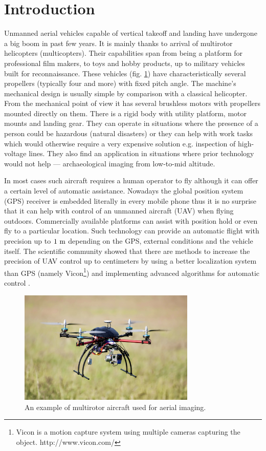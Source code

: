 \section{Introduction}

Unmanned aerial vehicles capable of vertical takeoff and landing have undergone a big boom in past few years. It is mainly thanks to arrival of multirotor helicopters (multicopters). Their capabilities span from being a platform for professional film makers, to toys and hobby products, up to military vehicles built for reconnaissance. These vehicles (fig. \ref{fig:quadru1}) have characteristically several propellers (typically four and more) with fixed pitch angle. The machine's mechanical design is usually simple by comparison with a classical helicopter. From the mechanical point of view it has several brushless motors with propellers mounted directly on them. There is a rigid body with utility platform, motor mounts and landing gear. They can operate in situations where the presence of a person could be hazardous (natural disasters) or they can help with work tasks which would otherwise require a very expensive solution e.g. inspection of high-voltage lines. They also find an application in situations where prior technology would not help --- archaeological imaging from low-to-mid altitude.

In most cases such aircraft requires a human operator to fly although it can offer a certain level of automatic assistance. Nowadays the global position system (GPS) receiver is embedded literally in every mobile phone thus it is no surprise that it can help with control of an unmanned aircraft (UAV) when flying outdoors. Commercially available platforms can assist with position hold or even fly to a particular location. Such technology can provide an automatic flight with precision up to $1 ~\mathrm{m}$ depending on the GPS, external conditions and the vehicle itself. The scientific community showed that there are methods to increase the precision of UAV control up to centimeters by using a better localization system than GPS (namely Vicon\footnote{Vicon is a motion capture system using multiple cameras capturing the object. http://www.vicon.com/}) and implementing advanced algorithms for automatic control \citep{brescianini2013polearobatics, kumar2010grasp}.

\begin{figure}[h]
\centering
\includegraphics[width=0.75\textwidth]{fig/quadru1.jpg}
\caption{An example of multirotor aircraft used for aerial imaging.}
\label{fig:quadru1}
\end{figure}

